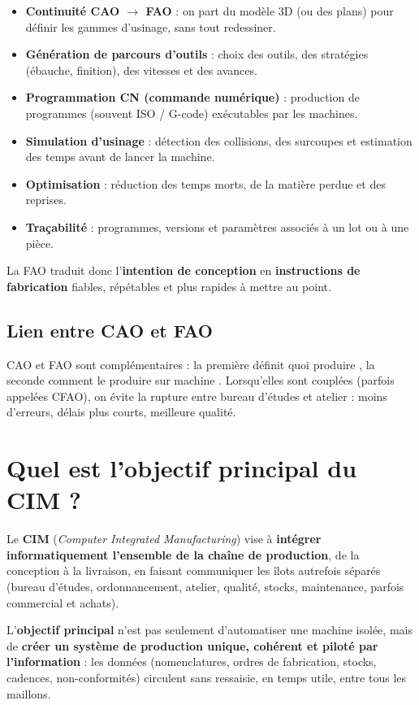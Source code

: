 \documentclass[12pt,a4paper]{article}
\begin{document}
\begin{itemize}
  \item \textbf{Continuité CAO $\rightarrow$ FAO} : on part du modèle 3D (ou des plans) pour définir les gammes d'usinage, sans tout redessiner.
  \item \textbf{Génération de parcours d'outils} : choix des outils, des stratégies (ébauche, finition), des vitesses et des avances.
  \item \textbf{Programmation CN (commande numérique)} : production de programmes (souvent ISO / G-code) exécutables par les machines.
  \item \textbf{Simulation d'usinage} : détection des collisions, des surcoupes et estimation des temps avant de lancer la machine.
  \item \textbf{Optimisation} : réduction des temps morts, de la matière perdue et des reprises.
  \item \textbf{Traçabilité} : programmes, versions et paramètres associés à un lot ou à une pièce.
\end{itemize}

La FAO traduit donc l'\textbf{intention de conception} en \textbf{instructions de fabrication} fiables, répétables et plus rapides à mettre au point.

\subsection{Lien entre CAO et FAO}

CAO et FAO sont complémentaires : la première définit \guillemotleft{} quoi produire \guillemotright{}, la seconde \guillemotleft{} comment le produire sur machine \guillemotright{}. Lorsqu'elles sont couplées (parfois appelées CFAO), on évite la rupture entre bureau d'études et atelier : moins d'erreurs, délais plus courts, meilleure qualité.

\section{Quel est l'objectif principal du CIM ?}

Le \textbf{CIM} (\textit{Computer Integrated Manufacturing}) vise à \textbf{intégrer informatiquement l'ensemble de la chaîne de production}, de la conception à la livraison, en faisant communiquer les îlots autrefois séparés (bureau d'études, ordonnancement, atelier, qualité, stocks, maintenance, parfois commercial et achats).

L'\textbf{objectif principal} n'est pas seulement d'automatiser une machine isolée, mais de \textbf{créer un système de production unique, cohérent et piloté par l'information} : les données (nomenclatures, ordres de fabrication, stocks, cadences, non-conformités) circulent sans ressaisie, en temps utile, entre tous les maillons.
\end{document}
